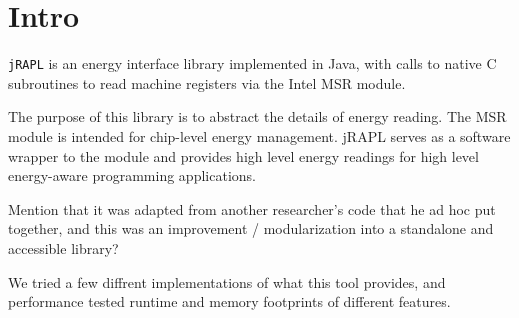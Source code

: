 \section{Intro}

\texttt{jRAPL} is an energy interface library implemented in Java,
with calls to native C subroutines to read machine registers via the
Intel MSR module.

The purpose of this library is to abstract the details of energy reading. The MSR
module is intended for chip-level energy management. jRAPL serves as a software
wrapper to the module and provides high level energy readings for high level
energy-aware programming applications.

Mention that it was adapted from another researcher's code that he ad hoc put together,
and this was an improvement / modularization into a standalone and accessible library?

We tried a few diffrent implementations of what this tool provides, and performance tested runtime and memory footprints of different features.